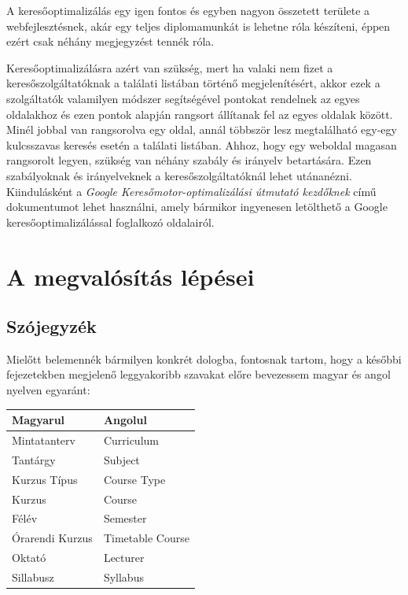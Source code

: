 \documentclass[hidelinks, 12pt, a4paper]{report}
\begin{document}
A keresőoptimalizálás egy igen fontos és egyben nagyon összetett területe a webfejlesztésnek, akár egy teljes diplomamunkát is lehetne róla készíteni, éppen ezért csak néhány megjegyzést tennék róla.

Keresőoptimalizálásra azért van szükség, mert ha valaki nem fizet a keresőszolgáltatóknak a találati listában történő megjelenítésért, akkor ezek a szolgáltatók valamilyen módszer segítségével pontokat rendelnek az egyes oldalakhoz és ezen pontok alapján rangsort állítanak fel az egyes oldalak között. Minél jobbal van rangsorolva egy oldal, annál többször lesz megtalálható egy-egy kulcsszavas keresés esetén a találati listában. Ahhoz, hogy egy weboldal magasan rangsorolt legyen, szükség van néhány szabály és irányelv betartására. Ezen szabályoknak és irányelveknek a keresőszolgáltatóknál lehet utánanézni. Kiindulásként a \emph{Google Keresőmotor-optimalizálási útmutató kezdőknek} című dokumentumot lehet használni, amely bármikor ingyenesen letölthető a Google keresőoptimalizálással foglalkozó oldalairól.


\chapter{A megvalósítás lépései}

\section{Szójegyzék}

Mielőtt belemennék bármilyen konkrét dologba, fontosnak tartom, hogy a későbbi fejezetekben megjelenő leggyakoribb szavakat előre bevezessem magyar és angol nyelven egyaránt:


\begin{table}[H]
	\centering
	\begin{tabular}{| l | l |}
	\hline
	\textbf{Magyarul} & \textbf{Angolul} \\
	\hline
	Mintatanterv & Curriculum \\
	\hline
	Tantárgy & Subject \\
	\hline
	Kurzus Típus & Course Type \\
	\hline
	Kurzus & Course \\
	\hline
	Félév & Semester \\
	\hline
	Órarendi Kurzus & Timetable Course \\
	\hline
	Oktató & Lecturer \\
	\hline
	Sillabusz & Syllabus \\
	\hline
\end{tabular}
\end{table}
\end{document}
